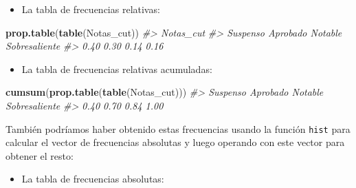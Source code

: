 \documentclass[
]{book}
\newenvironment{Shaded}{\begin{snugshade}}{\end{snugshade}}
\newcommand{\CommentTok}[1]{\textcolor[rgb]{0.56,0.35,0.01}{\textit{#1}}}
\newcommand{\DataTypeTok}[1]{\textcolor[rgb]{0.13,0.29,0.53}{#1}}
\newcommand{\DecValTok}[1]{\textcolor[rgb]{0.00,0.00,0.81}{#1}}
\newcommand{\KeywordTok}[1]{\textcolor[rgb]{0.13,0.29,0.53}{\textbf{#1}}}
\newcommand{\NormalTok}[1]{#1}
\newcommand{\OperatorTok}[1]{\textcolor[rgb]{0.81,0.36,0.00}{\textbf{#1}}}
\newcommand{\OtherTok}[1]{\textcolor[rgb]{0.56,0.35,0.01}{#1}}
\providecommand{\tightlist}{%
  \setlength{\itemsep}{0pt}\setlength{\parskip}{0pt}}
\theoremstyle{definition}
\theoremstyle{definition}
\theoremstyle{definition}
\theoremstyle{remark}
\begin{document}
\begin{itemize}
\tightlist
\item
  La tabla de frecuencias relativas:
\end{itemize}

\begin{Shaded}
\begin{Highlighting}[]
\KeywordTok{prop.table}\NormalTok{(}\KeywordTok{table}\NormalTok{(Notas\_cut))   }
\CommentTok{\#\textgreater{} Notas\_cut}
\CommentTok{\#\textgreater{}      Suspenso      Aprobado       Notable Sobresaliente }
\CommentTok{\#\textgreater{}          0.40          0.30          0.14          0.16}
\end{Highlighting}
\end{Shaded}

\begin{itemize}
\tightlist
\item
  La tabla de frecuencias relativas acumuladas:
\end{itemize}

\begin{Shaded}
\begin{Highlighting}[]
\KeywordTok{cumsum}\NormalTok{(}\KeywordTok{prop.table}\NormalTok{(}\KeywordTok{table}\NormalTok{(Notas\_cut)))  }
\CommentTok{\#\textgreater{}      Suspenso      Aprobado       Notable Sobresaliente }
\CommentTok{\#\textgreater{}          0.40          0.70          0.84          1.00}
\end{Highlighting}
\end{Shaded}

También podríamos haber obtenido estas frecuencias usando la función \texttt{hist} para calcular el vector de frecuencias absolutas y luego operando con este vector para obtener el resto:

\begin{itemize}
\tightlist
\item
  La tabla de frecuencias absolutas:
\end{itemize}

\begin{Shaded}
\end{Shaded}
\end{document}
